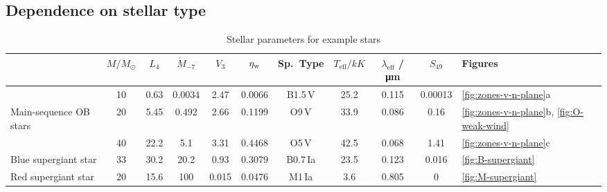 \subsection{Dependence on stellar type}
\label{sec:depend-stell-type}

\begin{table}
  \centering
  \caption{Stellar parameters for example stars}
  \label{tab:stars}
  \begin{tabular}{l S S S S S S S S S l}
    \toprule
    & {\(M / \si{M_\odot}\)} & {\(L_4\)}
    & {\(\dot{M}_{-7}\)} & {\(V_3\)} & {\( \eta_{\text{w}} \)}
    & {Sp.~Type} 
    & {\(T_{\text{eff}} / \si{kK}\)} & {\(\lambda_{\text{eff}}\) / \si{\um}}
    & {\(S_{49}\)} & Figures 
    \\
    \midrule
    & 10 & 0.63 & 0.0034 & 2.47 & 0.0066 & {B1.5\,V} & 25.2 & 0.115 & 0.00013
                   & \ref{fig:zones-v-n-plane}a \\
    Main-sequence OB stars
    & 20 & 5.45 & 0.492 & 2.66 & 0.1199 & {O9\,V} & 33.9 & 0.086 & 0.16
                   & \ref{fig:zones-v-n-plane}b, \ref{fig:O-weak-wind} \\
    & 40 & 22.2 & 5.1 & 3.31 & 0.4468 & {O5\,V} & 42.5 & 0.068 & 1.41
                   & \ref{fig:zones-v-n-plane}c\\[\smallskipamount]
    Blue supergiant star
    & 33 & 30.2 & 20.2 & 0.93 & 0.3079 & {B0.7\,Ia} & 23.5 & 0.123 & 0.016
                   & \ref{fig:B-supergiant} \\[\smallskipamount]
    Red supergiant star
    & 20 & 15.6 & 100 & 0.015 & 0.0476 & {M1\,Ia} & 3.6 & 0.805 & 0
                   & \ref{fig:M-supergiant} \\ 
    \bottomrule
  \end{tabular}
\end{table}


